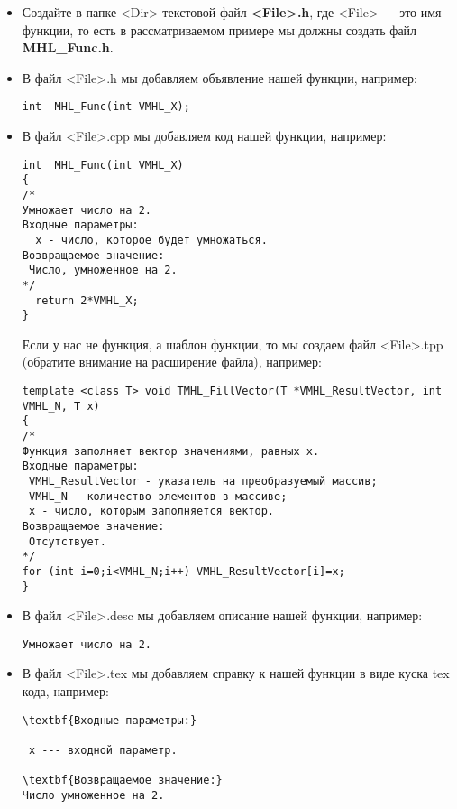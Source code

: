 \documentclass[a4paper,12pt]{article}
\begin{document}
\begin{itemize}
\item Создайте в папке <Dir> текстовой файл \textbf{<File>.h}, где <File> --- это имя функции, то есть в рассматриваемом примере мы должны создать файл \textbf{MHL\_Func.h}.
\item В файл <File>.h мы добавляем объявление нашей функции, например:
\begin{lstlisting}[label=examplefileh, caption=Содержимое MHL\_Func.h]
int  MHL_Func(int VMHL_X);
\end{lstlisting}
\item В файл <File>.cpp мы добавляем код нашей функции, например:
\begin{lstlisting}[label=examplefilecpp, caption=Содержимое MHL\_Func.cpp]
int  MHL_Func(int VMHL_X)
{
/*
Умножает число на 2.
Входные параметры:
  x - число, которое будет умножаться.
Возвращаемое значение:
 Число, умноженное на 2.
*/
  return 2*VMHL_X;
}
\end{lstlisting}

Если у нас не функция, а шаблон функции, то мы создаем файл <File>.tpp (обратите внимание на расширение файла), например:
\begin{lstlisting}[label=examplefiletpp, caption=Содержимое TMHL\_FillVector.tpp]
template <class T> void TMHL_FillVector(T *VMHL_ResultVector, int VMHL_N, T x)
{
/*
Функция заполняет вектор значениями, равных x.
Входные параметры:
 VMHL_ResultVector - указатель на преобразуемый массив;
 VMHL_N - количество элементов в массиве;
 x - число, которым заполняется вектор.
Возвращаемое значение:
 Отсутствует.
*/
for (int i=0;i<VMHL_N;i++) VMHL_ResultVector[i]=x;
}
\end{lstlisting}

\item В файл <File>.desc мы добавляем описание нашей функции, например:
\begin{lstlisting}[label=examplefiledesc, caption=Содержимое MHL\_Func.desc]
Умножает число на 2.
\end{lstlisting}

\item В файл <File>.tex мы добавляем справку к нашей функции в виде куска tex кода, например:
\begin{lstlisting}[label=examplefiletex, caption=Содержимое MHL\_Func.tex]
\textbf{Входные параметры:}

 x --- входной параметр.

\textbf{Возвращаемое значение:}
Число умноженное на 2.
\end{lstlisting}


\end{itemize}
\end{document}
